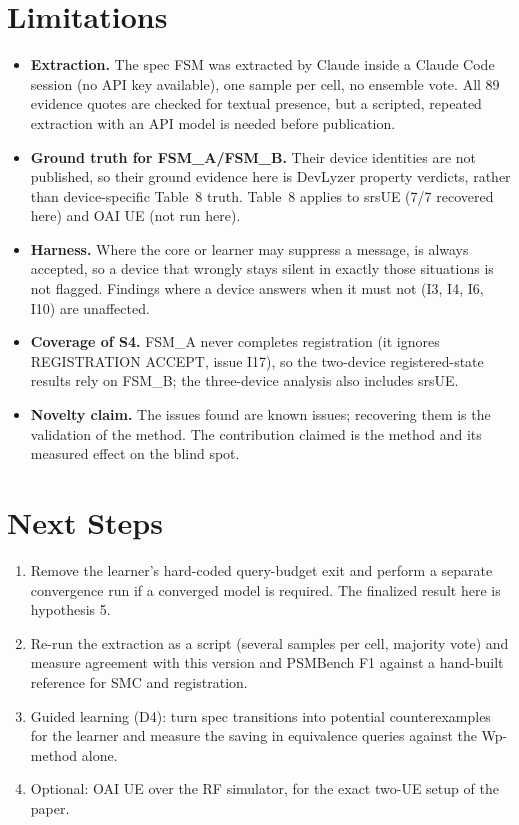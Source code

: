 \documentclass[11pt,a4paper]{article}
\newcommand{\sym}[1]{\texttt{\detokenize{#1}}}
\begin{document}
\section{Limitations}

\begin{itemize}[itemsep=3pt]
  \item \textbf{Extraction.} The spec FSM was extracted by Claude inside a Claude Code session (no API key
        available), one sample per cell, no ensemble vote. All 89 evidence quotes are checked for textual presence, but a scripted, repeated
        extraction with an API model is needed before publication.
  \item \textbf{Ground truth for FSM\_A/FSM\_B.} Their device identities are not published, so their ground
        evidence here is DevLyzer property verdicts, rather than device-specific Table~8 truth. Table~8 applies to srsUE (7/7 recovered here) and OAI UE (not run here).
  \item \textbf{Harness.} Where the core or learner may suppress a message, \sym{null_action} is always
        accepted, so a device that wrongly stays silent in exactly those situations is not flagged. Findings
        where a device answers when it must not (I3, I4, I6, I10) are unaffected.
  \item \textbf{Coverage of S4.} FSM\_A never completes registration (it ignores REGISTRATION ACCEPT, issue
        I17), so the two-device registered-state results rely on FSM\_B; the three-device analysis also includes srsUE.
  \item \textbf{Novelty claim.} The issues found are known issues; recovering them is the validation of the
        method. The contribution claimed is the method and its measured effect on the blind spot.
\end{itemize}

\section{Next Steps}

\begin{enumerate}[itemsep=3pt]
  \item Remove the learner's hard-coded query-budget exit and perform a separate convergence run if a
        converged model is required. The finalized result here is hypothesis 5.
  \item Re-run the extraction as a script (several samples per cell, majority vote) and measure agreement with
        this version and PSMBench F1 against a hand-built reference for SMC and registration.
  \item Guided learning (D4): turn spec transitions into potential counterexamples for the learner and measure
        the saving in equivalence queries against the Wp-method alone.
  \item Optional: OAI UE over the RF simulator, for the exact two-UE setup of the paper.
\end{enumerate}
\end{document}
